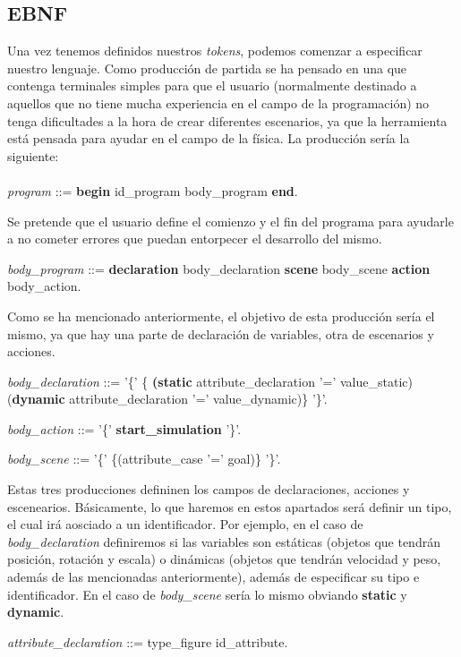 \documentclass[12pt]{article}
\begin{document}
\subsection{EBNF}

Una vez tenemos definidos nuestros \textit{tokens}, podemos comenzar a especificar nuestro lenguaje. Como producción de partida se ha pensado en una que contenga terminales simples para que el usuario (normalmente destinado a aquellos que no tiene mucha experiencia en el campo de la programación) no tenga dificultades a la hora de crear diferentes escenarios, ya que la herramienta está pensada para ayudar en el campo de la física. La producción sería la siguiente: \\ \\
\noindent \textit{program} ::= \textbf{begin} id\_program body\_program \textbf{end}.

Se pretende que el usuario define el comienzo y el fin del programa para ayudarle a no cometer errores que puedan entorpecer el desarrollo del mismo.

\noindent \textit{body\_program} ::= \textbf{declaration} body\_declaration \textbf{scene} body\_scene \textbf{action} body\_action.

Como se ha mencionado anteriormente, el objetivo de esta producción sería el mismo, ya que hay una parte de declaración de variables, otra de escenarios y acciones.

\noindent\textit{body\_declaration} ::= '\{' \{ \textbf{(static} attribute\_declaration '=' value\_static) \textbar (\textbf{dynamic} attribute\_declaration '=' value\_dynamic)\}  '\}'.

\noindent \textit{body\_action} ::= '\{' \textbf{start\_simulation} '\}'.

\noindent \textit{body\_scene} ::= '\{' \{(attribute\_case '=' goal)\} '\}'.

Estas tres producciones defininen los campos de declaraciones, acciones y escenearios. Básicamente, lo que haremos en estos apartados será definir un tipo, el cual irá aosciado a un identificador. Por ejemplo, en el caso de \textit{body\_declaration} definiremos si las variables son estáticas (objetos que tendrán posición, rotación y escala) o dinámicas (objetos que tendrán velocidad y peso, además de las mencionadas anteriormente), además de especificar su tipo e identificador. En el caso de \textit{body\_scene} sería lo mismo obviando \textbf{static} y \textbf{dynamic}.

\noindent \textit{attribute\_declaration} ::= type\_figure id\_attribute.
\end{document}
